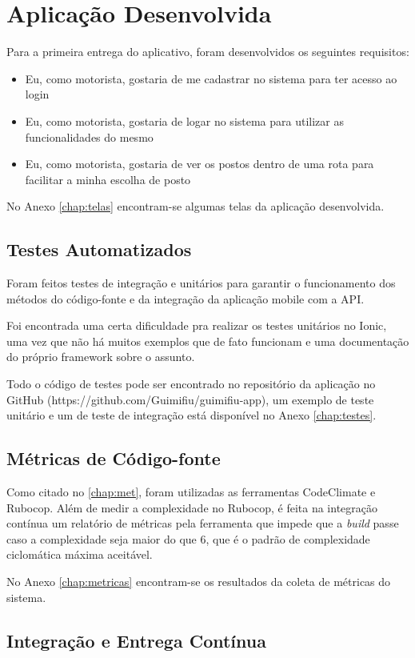 \section{Aplicação Desenvolvida}
Para a primeira entrega do aplicativo, foram desenvolvidos os seguintes requisitos:
\begin{itemize}
    \item Eu, como motorista, gostaria de me cadastrar no sistema para ter acesso ao login
    \item Eu, como motorista, gostaria de logar no sistema para utilizar as funcionalidades do mesmo
    \item Eu, como motorista, gostaria de ver os postos dentro de uma rota para facilitar a minha escolha de posto
\end{itemize}
No Anexo \ref{chap:telas} encontram-se algumas telas da aplicação desenvolvida.

\subsection{Testes Automatizados}

Foram feitos testes de integração e unitários para garantir o funcionamento dos métodos do código-fonte e da integração da aplicação mobile com a API.

Foi encontrada uma certa dificuldade pra realizar os testes unitários no Ionic, uma vez que não há muitos exemplos que de fato funcionam e uma documentação do próprio framework sobre o assunto.

Todo o código de testes pode ser encontrado no repositório da aplicação no GitHub (https://github.com/Guimifiu/guimifiu-app), um exemplo de teste unitário e um de teste de integração está disponível no Anexo \ref{chap:testes}.

\subsection{Métricas de Código-fonte}

Como citado no \autoref{chap:met}, foram utilizadas as ferramentas CodeClimate e Rubocop. Além de medir a complexidade no Rubocop, é feita na integração contínua um relatório de métricas pela ferramenta que impede que a \textit{build} passe caso a complexidade seja maior do que 6, que é o padrão de complexidade ciclomática máxima aceitável.

No Anexo \ref{chap:metricas} encontram-se os resultados da coleta de métricas do sistema.

\subsection{Integração e Entrega Contínua}

